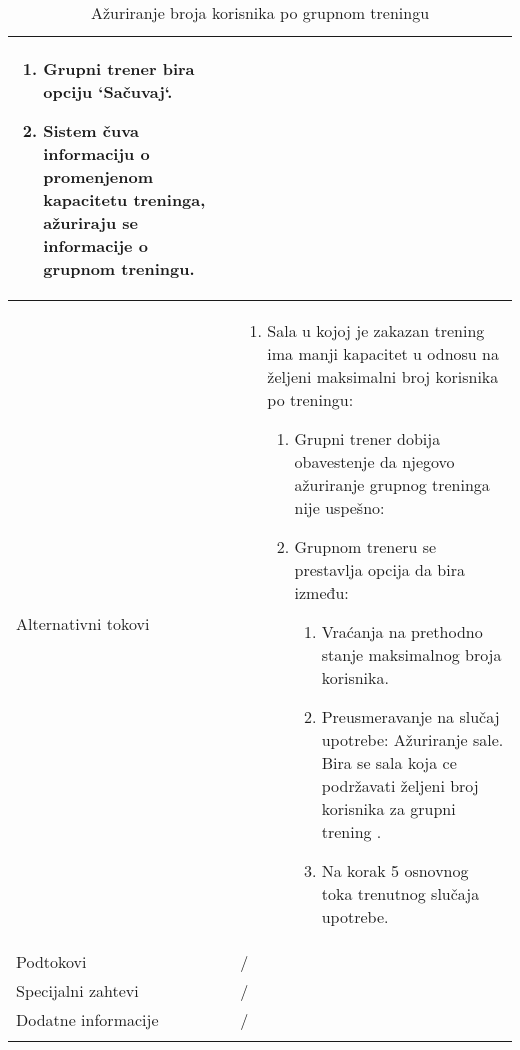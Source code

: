 \documentclass[../grupniTreninzi.tex]{subfiles}
\begin{document}
\begin{longtable}{| p{} | p{} |}
\begin{enumerate}
        \item Grupni trener bira opciju `Sačuvaj`.
        \item Sistem čuva informaciju o promenjenom kapacitetu treninga, ažuriraju se informacije o grupnom treningu.
    \end{enumerate}\\
\hline
    Alternativni tokovi & 
       \begin{enumerate}
        \item Sala u kojoj je zakazan trening ima manji kapacitet u odnosu na željeni maksimalni broj korisnika po treningu:
            \begin{enumerate}
                \item Grupni trener dobija obavestenje da njegovo ažuriranje grupnog  treninga nije uspešno:
                \item Grupnom treneru se prestavlja opcija da bira između:
                    \begin{enumerate}
                        \item Vraćanja na prethodno stanje maksimalnog broja korisnika.
                        \item Preusmeravanje na slučaj upotrebe: Ažuriranje sale. Bira se sala koja ce podržavati željeni broj korisnika za grupni trening .
                        \item Na korak 5 osnovnog toka trenutnog slučaja upotrebe.
                    \end{enumerate}
            \end{enumerate}
    \end{enumerate}\\
\hline
    Podtokovi & /\\
\hline
    Specijalni zahtevi & /\\
\hline
    Dodatne informacije & /\\
\hline
\caption{Ažuriranje broja korisnika po grupnom treningu} %
\end{longtable}
\end{document}
